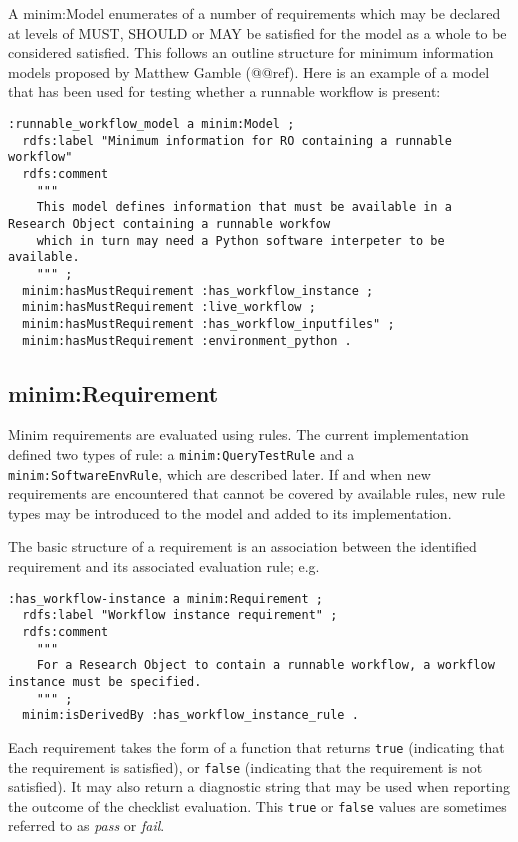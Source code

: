 \documentclass[]{article}
\begin{document}
A minim:Model enumerates of a number of requirements which may be
declared at levels of MUST, SHOULD or MAY be satisfied for the model as
a whole to be considered satisfied. This follows an outline structure
for minimum information models proposed by Matthew Gamble (@@ref). Here
is an example of a model that has been used for testing whether a
runnable workflow is present:

\begin{verbatim}
:runnable_workflow_model a minim:Model ;
  rdfs:label "Minimum information for RO containing a runnable workflow"
  rdfs:comment
    """
    This model defines information that must be available in a Research Object containing a runnable workfow
    which in turn may need a Python software interpeter to be available.
    """ ;
  minim:hasMustRequirement :has_workflow_instance ;
  minim:hasMustRequirement :live_workflow ;
  minim:hasMustRequirement :has_workflow_inputfiles" ;
  minim:hasMustRequirement :environment_python .
\end{verbatim}

\subsection{minim:Requirement}

Minim requirements are evaluated using rules. The current implementation
defined two types of rule: a \texttt{minim:QueryTestRule} and a
\texttt{minim:SoftwareEnvRule}, which are described later. If and when
new requirements are encountered that cannot be covered by available
rules, new rule types may be introduced to the model and added to its
implementation.

The basic structure of a requirement is an association between the
identified requirement and its associated evaluation rule; e.g.

\begin{verbatim}
:has_workflow-instance a minim:Requirement ;
  rdfs:label "Workflow instance requirement" ;
  rdfs:comment
    """
    For a Research Object to contain a runnable workflow, a workflow instance must be specified.
    """ ;
  minim:isDerivedBy :has_workflow_instance_rule .
\end{verbatim}

Each requirement takes the form of a function that returns \texttt{true}
(indicating that the requirement is satisfied), or \texttt{false}
(indicating that the requirement is not satisfied). It may also return a
diagnostic string that may be used when reporting the outcome of the
checklist evaluation. This \texttt{true} or \texttt{false} values are
sometimes referred to as \emph{pass} or \emph{fail}.
\end{document}
